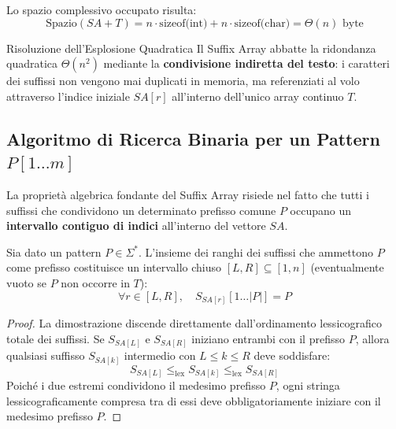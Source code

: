 Lo spazio complessivo occupato risulta:
\begin{equation}
  \text{Spazio}(SA + T) = n \cdot \text{sizeof(int)} + n \cdot \text{sizeof(char)} = \Theta(n) \text{ byte}
\end{equation}

\begin{noteblock}{Risoluzione dell'Esplosione Quadratica}
Il Suffix Array abbatte la ridondanza quadratica $\Theta(n^2)$ mediante la \textbf{condivisione indiretta del testo}: i caratteri dei suffissi non vengono mai duplicati in memoria, ma referenziati al volo attraverso l'indice iniziale $SA[r]$ all'interno dell'unico array continuo $T$.
\end{noteblock}

\FloatBarrier
\subsection{Algoritmo di Ricerca Binaria per un Pattern $P[1 \dots m]$}
\label{subsec:ricerca-binaria-sa}

La propriet\`a algebrica fondante del Suffix Array risiede nel fatto che tutti i suffissi che condividono un determinato prefisso comune $P$ occupano un \textbf{intervallo contiguo di indici} all'interno del vettore $SA$.

\begin{lemma}
\label{lem:contiguita-sa}
Sia dato un pattern $P \in \Sigma^*$. L'insieme dei ranghi dei suffissi che ammettono $P$ come prefisso costituisce un intervallo chiuso $[L, R] \subseteq [1, n]$ (eventualmente vuoto se $P$ non occorre in $T$):
\begin{equation}
  \forall r \in [L, R], \quad S_{SA[r]}[1 \dots |P|] = P
\end{equation}
\end{lemma}

\begin{proof}
La dimostrazione discende direttamente dall'ordinamento lessicografico totale dei suffissi. Se $S_{SA[L]}$ e $S_{SA[R]}$ iniziano entrambi con il prefisso $P$, allora qualsiasi suffisso $S_{SA[k]}$ intermedio con $L \le k \le R$ deve soddisfare:
\begin{equation}
  S_{SA[L]} \le_{\text{lex}} S_{SA[k]} \le_{\text{lex}} S_{SA[R]}
\end{equation}
Poich\'e i due estremi condividono il medesimo prefisso $P$, ogni stringa lessicograficamente compresa tra di essi deve obbligatoriamente iniziare con il medesimo prefisso $P$.
\end{proof}

